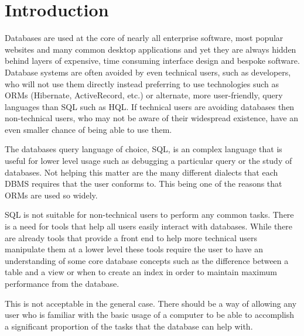 \chapter{Introduction}

Databases are used at the core of nearly all enterprise software, most popular
websites and many common desktop applications and yet they are always hidden
behind layers of expensive, time consuming interface design and bespoke
software. Database systems are often avoided by even technical users, such as
developers, who will not use them directly instead preferring to use
technologies such as \acp{ORM} (Hibernate, ActiveRecord, etc.) or alternate,
more user-friendly, query languages than \ac{SQL} such as \ac{HQL}. If
technical users are avoiding databases then non-technical users, who may not be
aware of their widespread existence, have an even smaller chance of being able
to use them.

The databases query language of choice, \ac{SQL}, is an complex language that
is useful for lower level usage such as debugging a particular query or the
study of databases. Not helping this matter are the many different dialects
that each \ac{DBMS} requires that the user conforms to. This being one of the
reasons that \acp{ORM} are used so widely.

\ac{SQL} is not suitable for non-technical users to perform any common tasks.
There is a need for tools that help all users easily interact with databases.
While there are already tools that provide a front end to help more technical
users manipulate them at a lower level these tools require the user to have an
understanding of some core database concepts such as the difference between
a table and a view or when to create an index in order to maintain maximum
performance from the database.

This is not acceptable in the general case. There should be a way of allowing
any user who is familiar with the basic usage of a computer to be able to
accomplish a significant proportion of the tasks that the database can help
with.
